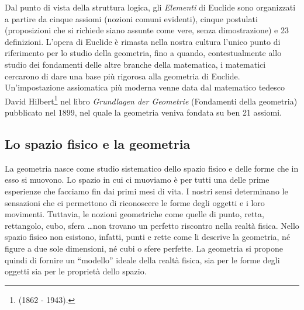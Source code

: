 Dal punto di vista della struttura logica, gli \emph{Elementi} di Euclide sono organizzati a partire da cinque assiomi (nozioni comuni evidenti), cinque postulati (proposizioni che si richiede siano assunte come vere, senza dimostrazione) e 23 definizioni. L'opera di Euclide è rimasta nella nostra cultura l'unico punto di riferimento per lo studio della geometria, fino a quando, contestualmente allo studio dei fondamenti delle altre branche della matematica, i matematici cercarono di dare una base più rigorosa alla geometria di Euclide. Un'impostazione assiomatica più moderna venne data dal matematico tedesco David Hilbert\footnote{(1862 - 1943).} nel libro \emph{Grundlagen der Geometrie} (Fondamenti della geometria) pubblicato nel 1899, nel quale la geometria veniva fondata su ben 21 assiomi.

\subsection{Lo spazio fisico e la geometria}
La geometria nasce come studio sistematico dello spazio fisico e delle forme che in esso si muovono. Lo spazio in cui ci muoviamo è per tutti una delle prime esperienze che facciamo fin dai primi mesi di vita. I nostri sensi determinano le sensazioni che ci permettono di riconoscere le forme degli oggetti e i loro movimenti. Tuttavia, le nozioni geometriche come quelle di punto, retta, rettangolo, cubo, sfera \ldots non trovano un perfetto riscontro nella realtà fisica. Nello spazio fisico non esistono, infatti, punti e rette come li descrive la geometria, né figure a due sole dimensioni, né cubi o sfere perfette. La geometria si propone quindi di fornire un ``modello'' ideale della realtà fisica, sia per le forme degli oggetti sia per le proprietà dello spazio. 

